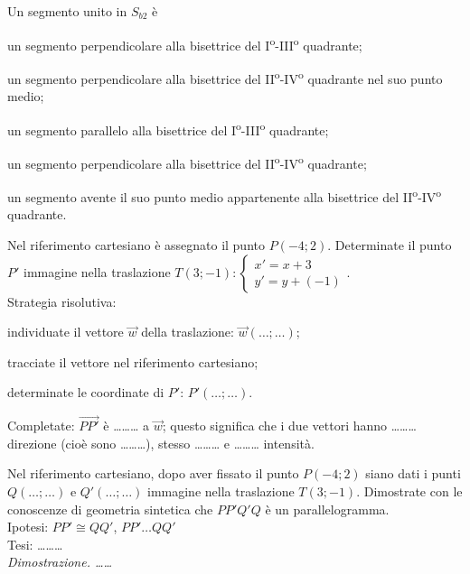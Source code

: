 \begin{esercizio}
	\label{ese:8.43} %
	Un segmento unito in $S_{b2}$ è
	\begin{enumeratea}
		\item un segmento perpendicolare alla bisettrice del 
		I\textsuperscript{o}-III\textsuperscript{o} quadrante;
		\item un segmento perpendicolare alla bisettrice del 
		II\textsuperscript{o}-IV\textsuperscript{o} quadrante nel suo punto 
		medio;
		\item un segmento parallelo alla bisettrice del 
		I\textsuperscript{o}-III\textsuperscript{o} quadrante;
		\item un segmento perpendicolare alla bisettrice del 
		II\textsuperscript{o}-IV\textsuperscript{o} quadrante;
		\item un segmento avente il suo punto medio appartenente alla 
		bisettrice del II\textsuperscript{o}-IV\textsuperscript{o} quadrante.
	\end{enumeratea}
\end{esercizio}

\begin{esercizio}
	\label{ese:8.48} %
	Nel riferimento cartesiano è assegnato il punto $P(-4;2)$. 
	Determinate il punto $P'$ immagine nella traslazione 
	$T(3;-1):\begin{cases}x'=x+3\\y'=y+(-1)\end{cases}$.\\
	Strategia risolutiva:
	\begin{enumerate*}
		\item individuate il vettore $\vec{w}$ della traslazione: 
		$\vec{w}(\ldots{};\ldots{})$;
		\item tracciate il vettore nel riferimento cartesiano;
		\item determinate le coordinate di $P'$: $P'(\ldots{};\ldots{})$.
	\end{enumerate*}
	Completate: $\overrightarrow{PP'}$ è \ldots\ldots\ldots{} a 
	$\vec{w}$; questo significa che i due vettori hanno 
	\ldots\ldots\ldots{} direzione (cioè sono \ldots\ldots\ldots{}), 
	stesso \ldots\ldots\ldots{} e \ldots\ldots\ldots{} intensità.
\end{esercizio}

\begin{esercizio}
	\label{ese:8.49} %
	Nel riferimento cartesiano, dopo aver fissato il punto $P(-4;2)$ 
	siano dati i punti $Q(\ldots{};\ldots{})$ e $Q'(\ldots{};\ldots{})$ 
	immagine nella traslazione $T(3;-1)$. Dimostrate con le conoscenze di 
	geometria sintetica che $PP'Q'Q$ è un parallelogramma.\vspace{5pt}\\
	\noindent Ipotesi: $PP'\cong QQ'$, $PP'\ldots{}QQ'$\\
	Tesi: \ldots\ldots\ldots{}\vspace{3pt}\\
	\emph{Dimostrazione. \ldots\ldots{}}
\end{esercizio}

